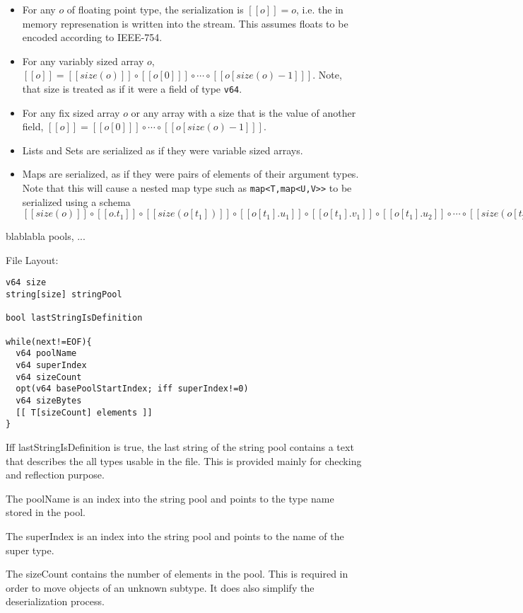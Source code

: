 \documentclass[a4paper,10pt]{article}
\newcommand{\den}[1]{[\![#1]\!]}
\begin{document}
\begin{itemize}
 \item For any $o$ of floating point type, the serialization is $\den{o} = o$, i.e. the in memory represenation is written into the stream. This assumes floats to be encoded according to IEEE-754.
 
 \item For any variably sized array $o$, $\den{o} = \den{size(o)} \circ \den{o[0]} \circ \cdots \circ \den{o[size(o)-1]}$. Note, that size is treated as if it were a field of type \texttt{v64}.
 \item For any fix sized array $o$ or any array with a size that is the value of another field, $\den{o} = \den{o[0]} \circ \cdots \circ \den{o[size(o)-1]}$.
 
 \item Lists and Sets are serialized as if they were variable sized arrays.
 
 \item Maps are serialized, as if they were pairs of elements of their argument types. Note that this will cause a nested map type such as \verb/map<T,map<U,V>>/ to be serialized using a schema $ \den{size(o)} \circ \den{o.t_1} \circ \den{size(o[t_1])} \circ \den{o[t_1].u_1} \circ \den{o[t_1].v_1} \circ \den{o[t_1].u_2} \circ \cdots \circ \den{size(o[t_2])} \circ \cdots \circ \den{o[t_n].v_m}$
\end{itemize}
 
blablabla pools, ...

File Layout:

\begin{verbatim}
v64 size
string[size] stringPool

bool lastStringIsDefinition

while(next!=EOF){
  v64 poolName
  v64 superIndex
  v64 sizeCount
  opt(v64 basePoolStartIndex; iff superIndex!=0)
  v64 sizeBytes
  [[ T[sizeCount] elements ]]
}
\end{verbatim}

Iff lastStringIsDefinition is true, the last string of the string pool contains a text that describes the all types usable in the file. This is provided mainly for checking and reflection purpose.

The poolName is an index into the string pool and points to the type name stored in the pool.

The superIndex is an index into the string pool and points to the name of the super type.

The sizeCount contains the number of elements in the pool. This is required in order to move objects of an unknown subtype. It does also simplify the deserialization process.
\end{document}
